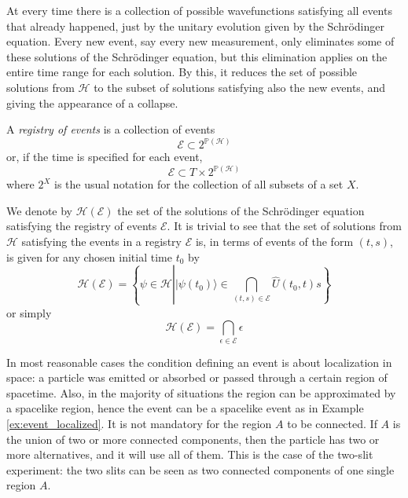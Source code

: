 \documentclass[12pt]{amsart}
\theoremstyle{definition}
\theoremstyle{plain}
\begin{document}
At every time there is a collection of possible wavefunctions satisfying all events that already happened, just by the unitary evolution given by the Schr\"odinger equation. Every new event, say every new measurement, only eliminates some of these solutions of the Schr\"odinger equation, but this elimination applies on the entire time range for each solution. By this, it reduces the set of possible solutions from $\mathscr{H}$ to the subset of solutions satisfying also the new events, and giving the appearance of a collapse.

A \emph{registry of events} is a collection of events
\begin{equation}
\mathcal E\subset 2^{\mathbb P(\mathscr{H})}
\end{equation}
or, if the time is specified for each event,
\begin{equation}
\mathcal E\subset T\times 2^{\mathbb P(\mathcal{H})}
\end{equation}
where $2^X$ is the usual notation for the collection of all subsets of a set $X$.

We denote by $\mathscr{H}(\mathcal E)$ the set of the solutions of the Schr\"odinger equation satisfying the registry of events $\mathcal E$.
It is trivial to see that the set of solutions from $\mathscr{H}$ satisfying the events in a registry $\mathcal E$ is,
in terms of events of the form $(t,s)$, is given for any chosen initial time $t_0$ by
\begin{equation}
\label{eq:registry_temporal}
\mathscr{H}(\mathcal E) = \left\{\psi\in\mathscr{H}\left||{\psi(t_0)}\rangle\in\bigcap_{(t,s)\in\mathcal E}\hat U(t_0,t)s\right\}\right.
\end{equation}
or simply
\begin{equation}
\label{eq:registry_timeless}
\mathscr{H}(\mathcal E)=\bigcap_{\epsilon\in\mathcal E}\epsilon
\end{equation}

In most reasonable cases the condition defining an event is about localization in space: a particle was emitted or absorbed or passed through a certain region of spacetime. Also, in the majority of situations the region can be approximated by a spacelike region, hence the event can be a spacelike event as in Example \ref{ex:event_localized}. It is not mandatory for the region $A$ to be connected. If $A$ is the union of two or more connected components, then the particle has two or more alternatives, and it will use all of them. This is the case of the two-slit experiment: the two slits can be seen as two connected components of one single region $A$.
\end{document}
